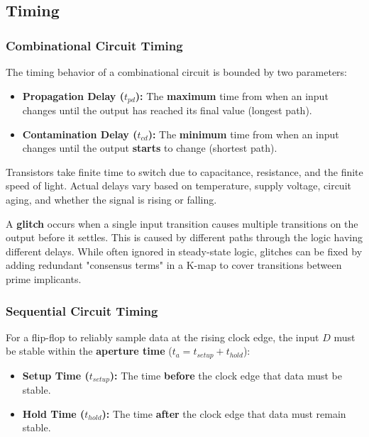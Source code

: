 \subsection{Timing}

\subsubsection{Combinational Circuit Timing}

\begin{definition}
	The timing behavior of a combinational circuit is bounded by two parameters:
	\begin{itemize}
		\item \textbf{Propagation Delay ($t_{pd}$):} The \textbf{maximum} time from when an input changes until the output has reached its final value (longest path).
		\item \textbf{Contamination Delay ($t_{cd}$):} The \textbf{minimum} time from when an input changes until the output \textbf{starts} to change (shortest path).
	\end{itemize}
\end{definition}

\begin{remark}
	Transistors take finite time to switch due to capacitance, resistance, and the finite speed of light. Actual delays vary based on temperature, supply voltage, circuit aging, and whether the signal is rising or falling.
\end{remark}

\begin{example}
	A \textbf{glitch} occurs when a single input transition causes multiple transitions on the output before it settles. This is caused by different paths through the logic having different delays. While often ignored in steady-state logic, glitches can be fixed by adding redundant "consensus terms" in a K-map to cover transitions between prime implicants.
\end{example}

\subsubsection{Sequential Circuit Timing}

\begin{definition}
	For a flip-flop to reliably sample data at the rising clock edge, the input $D$ must be stable within the \textbf{aperture time} ($t_a = t_{setup} + t_{hold}$):
	\begin{itemize}
		\item \textbf{Setup Time ($t_{setup}$):} The time \textbf{before} the clock edge that data must be stable.
		\item \textbf{Hold Time ($t_{hold}$):} The time \textbf{after} the clock edge that data must remain stable.
	\end{itemize}
\end{definition}

